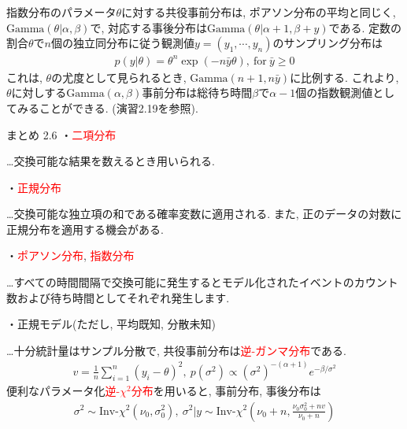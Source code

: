 \documentclass[10pt,dvipdfmx,a4]{beamer}
\newcommand{\eqn}[1]{\begin{align*}#1\end{align*}}
\newcommand{\tcr}[1]{\textcolor{red}{#1}}
\begin{document}

\begin{frame}
指数分布のパラメータ$\theta$に対する共役事前分布は, ポアソン分布の平均と同じく, $\text{Gamma}(\theta|\alpha,\beta)$で, 対応する事後分布は$\text{Gamma}(\theta|\alpha+1,\beta+y)$である.
定数の割合$\theta$で$n$個の独立同分布に従う観測値$y=(y_1,\cdots,y_n)$のサンプリング分布は
\eqn{p(y|\theta)=\theta^n\exp(-n\bar{y}\theta),\ \text{for}\ \bar{y}\geq 0}
これは, $\theta$の尤度として見られるとき, $\text{Gamma}(n+1,n\bar{y})$に比例する.
これより, $\theta$に対しする$\text{Gamma}(\alpha,\beta)$事前分布は総待ち時間$\beta$で$\alpha-1$個の指数観測値としてみることができる.
(演習2.19を参照).
\end{frame}


\begin{frame}[t]{まとめ 2.6}
・\tcr{二項分布}

…交換可能な結果を数えるとき用いられる.

・\tcr{正規分布}

…交換可能な独立項の和である確率変数に適用される.
また, 正のデータの対数に正規分布を適用する機会がある.

・\tcr{ポアソン分布}, \tcr{指数分布}

…すべての時間間隔で交換可能に発生するとモデル化されたイベントのカウント数および待ち時間としてそれぞれ発生します.

・正規モデル(ただし, 平均既知, 分散未知)

…十分統計量はサンプル分散で, 共役事前分布は\tcr{逆-ガンマ分布}である.
\eqn{v=\frac{1}{n}\sum_{i=1}^n(y_i-\theta)^2,\ p(\sigma^2)\propto (\sigma^2)^{-(\alpha+1)}e^{-\beta/\sigma^2}}
便利なパラメータ化\tcr{逆-$\chi^2$分布}を用いると, 事前分布, 事後分布は
\eqn{\sigma^2\sim \text{Inv-}\chi^2(\nu_0,\sigma_0^2),\ \sigma^2|y\sim \text{Inv-}\chi^2\left(\nu_0+n,\tfrac{\nu_0\sigma_0^2+nv}{\nu_0+n}\right)}
\end{frame}

\end{document}
